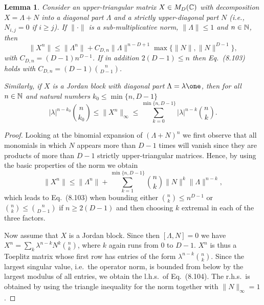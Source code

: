 \documentclass[11pt,a4paper]{article}
\theoremstyle{plain}
\newtheorem{lemma}{Lemma}[section]
\theoremstyle{definition}
\theoremstyle{remark}
\begin{document}
\begin{lemma}
    Consider an upper-triangular matrix $X\in M_D(\mathbb{C})$ with decomposition $X=\Lambda+N$ into a diagonal part $\Lambda$ and a strictly upper-diagonal part $N$
    (i.e., $N_{i,j}=0$ if $i\ge j$). If $\|\cdot\|$ is a sub-multiplicative norm, $\|\Lambda\|\le 1$ and $n\in\mathbb{N}$, then
    \begin{equation}\tag{8.103}
        \|X^n\| \le \|\Lambda^n\| + C_{D,n}\|\Lambda\|^{n-D+1}\max\{\|N\|,\|N\|^{D-1}\},
    \end{equation}
    with $C_{D,n}=(D-1)n^{D-1}$. If in addition $2(D-1)\le n$ then Eq.~(8.103) holds with $C_{D,n}=(D-1)\binom{n}{D-1}$.

    Similarly, if $X$ is a Jordan block with diagonal part $\Lambda=\lambda\one$, then for all $n\in\mathbb{N}$ and natural numbers $k_0\le \min\{n,D-1\}$
    \begin{equation}\tag{8.104}
        |\lambda|^{n-k_0}\binom{n}{k_0} \le \|X^n\|_\infty \le \sum_{k=0}^{\min\{n,D-1\}} |\lambda|^{n-k}\binom{n}{k}.
    \end{equation}
\end{lemma}

\begin{proof}
    Looking at the binomial expansion of $(\Lambda+N)^n$ we first observe that all monomials in which $N$ appears more than $D-1$ times will vanish since they
    are products of more than $D-1$ strictly upper-triangular matrices. Hence, by using the basic properties of the norm we obtain
    \begin{equation}\tag{8.105}
        \|X^n\| \le \|\Lambda^n\| + \sum_{k=1}^{\min\{n,D-1\}} \binom{n}{k}\|N\|^k\|\Lambda\|^{n-k},
    \end{equation}
    which leads to Eq.~(8.103) when bounding either $\binom{n}{k}\le n^{D-1}$ or $\binom{n}{k}\le \binom{n}{D-1}$ if $n\ge 2(D-1)$ and then choosing $k$ extremal in each of the three factors.

    Now assume that $X$ is a Jordan block. Since then $[\Lambda,N]=0$ we have
    $X^n = \sum_k \lambda^{n-k}N^k\binom{n}{k}$, where $k$ again runs from $0$ to $D-1$. $X^n$ is thus a Toeplitz matrix whose first row has entries of the form
    $\lambda^{n-k}\binom{n}{k}$. Since the largest singular value, i.e.\ the operator norm, is bounded from below by the largest modulus of all entries, we obtain the l.h.s.\ of Eq.~(8.104).
    The r.h.s.\ is obtained by using the triangle inequality for the norm together with $\|N\|_\infty=1$.
\end{proof}
\end{document}
